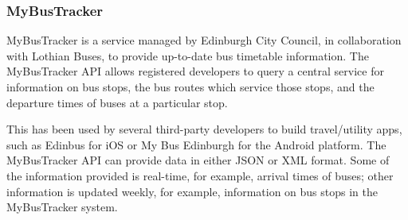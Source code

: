 \documentclass[10pt,twocolumn]{article}
\begin{document}
\subsubsection{MyBusTracker}
MyBusTracker is a service managed by Edinburgh City Council, in collaboration with Lothian Buses, to provide up-to-date bus timetable information. The MyBusTracker API allows registered developers to query a central service for information on bus stops, the bus routes which service those stops, and the departure times of buses at a particular stop. 

This has been used by several third-party developers to build travel/utility apps, such as Edinbus for iOS or My Bus Edinburgh for the Android platform.  The MyBusTracker API can provide data in either JSON or XML format. Some of the information provided is real-time, for example, arrival times of buses; other information is updated weekly, for example, information on bus stops in the MyBusTracker system.
\end{document}
